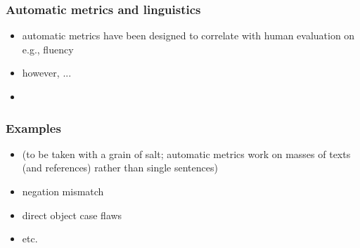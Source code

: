 \documentclass{beamer}
\begin{document}
\begin{frame}
    \frametitle{Automatic metrics and linguistics}
    \begin{itemize}
        \item automatic metrics have been designed to correlate with human
            evaluation on e.g., fluency
        \item however, ...
        \item
    \end{itemize}
\end{frame}

\begin{frame}
    \frametitle{Examples}
    \begin{itemize}
        \item (to be taken with a grain of salt; automatic metrics work on
            masses of texts (and references) rather than single sentences)
        \item negation mismatch
        \item direct object case flaws
        \item etc.
    \end{itemize}
\end{frame}
\end{document}
